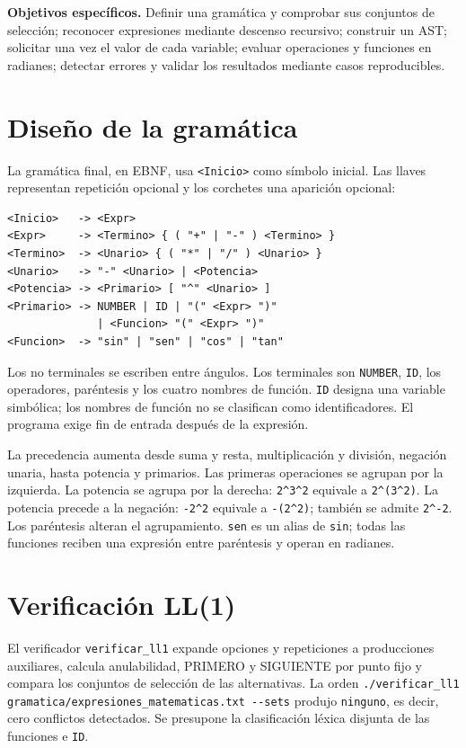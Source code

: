 \documentclass[11pt,a4paper]{article}
\begin{document}
\textbf{Objetivos específicos.} Definir una gramática y comprobar sus conjuntos de selección; reconocer expresiones mediante descenso recursivo; construir un AST; solicitar una vez el valor de cada variable; evaluar operaciones y funciones en radianes; detectar errores y validar los resultados mediante casos reproducibles.
\section{Diseño de la gramática}
La gramática final, en EBNF, usa \texttt{<Inicio>} como símbolo inicial. Las llaves representan repetición opcional y los corchetes una aparición opcional:
\begin{verbatim}
<Inicio>   -> <Expr>
<Expr>     -> <Termino> { ( "+" | "-" ) <Termino> }
<Termino>  -> <Unario> { ( "*" | "/" ) <Unario> }
<Unario>   -> "-" <Unario> | <Potencia>
<Potencia> -> <Primario> [ "^" <Unario> ]
<Primario> -> NUMBER | ID | "(" <Expr> ")"
              | <Funcion> "(" <Expr> ")"
<Funcion>  -> "sin" | "sen" | "cos" | "tan"
\end{verbatim}
Los no terminales se escriben entre ángulos. Los terminales son \texttt{NUMBER}, \texttt{ID}, los operadores, paréntesis y los cuatro nombres de función. \texttt{ID} designa una variable simbólica; los nombres de función no se clasifican como identificadores. El programa exige fin de entrada después de la expresión.

La precedencia aumenta desde suma y resta, multiplicación y división, negación unaria, hasta potencia y primarios. Las primeras operaciones se agrupan por la izquierda. La potencia se agrupa por la derecha: \verb|2^3^2| equivale a \verb|2^(3^2)|. La potencia precede a la negación: \verb|-2^2| equivale a \verb|-(2^2)|; también se admite \verb|2^-2|. Los paréntesis alteran el agrupamiento. \texttt{sen} es un alias de \texttt{sin}; todas las funciones reciben una expresión entre paréntesis y operan en radianes.
\section{Verificación LL(1)}
El verificador \texttt{verificar\_ll1} expande opciones y repeticiones a producciones auxiliares, calcula anulabilidad, PRIMERO y SIGUIENTE por punto fijo y compara los conjuntos de selección de las alternativas. La orden \verb|./verificar_ll1 gramatica/expresiones_matematicas.txt --sets| produjo \texttt{ninguno}, es decir, cero conflictos detectados. Se presupone la clasificación léxica disjunta de las funciones e \texttt{ID}.
\end{document}
